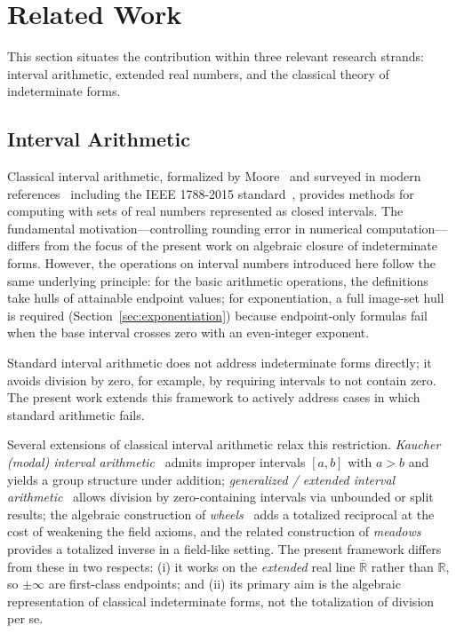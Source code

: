 \documentclass[11pt,a4paper]{article}
\theoremstyle{paperdef}
\newcommand{\Rext}{\overline{\mathbb{R}}}
\begin{document}
\section{Related Work}\label{sec:related-work}

This section situates the contribution within three relevant research
strands: interval arithmetic, extended real numbers, and the classical
theory of indeterminate forms.

\subsection{Interval Arithmetic}

Classical interval arithmetic, formalized by Moore~\cite{Moore1966}
and surveyed in modern references~\cite{Moore2009,Neumaier1990}
including the IEEE 1788-2015 standard~\cite{IEEE1788}, provides
methods for computing with sets of real numbers represented as closed
intervals. The fundamental motivation---controlling rounding error in
numerical computation---differs from the focus of the present work on
algebraic closure of indeterminate forms. However, the operations on
interval numbers introduced here follow the same underlying principle:
for the basic arithmetic operations, the definitions take hulls of
attainable endpoint values; for exponentiation, a full image-set hull
is required (Section~\ref{sec:exponentiation}) because endpoint-only
formulas fail when the base interval crosses zero with an even-integer
exponent.

Standard interval arithmetic does not address indeterminate forms
directly; it avoids division by zero, for example, by requiring
intervals to not contain zero. The present work extends this framework
to actively address cases in which standard arithmetic fails.

Several extensions of classical interval arithmetic relax this
restriction. \emph{Kaucher (modal) interval
arithmetic}~\cite{Kaucher1980} admits improper intervals $[a, b]$ with
$a > b$ and yields a group structure under addition; \emph{generalized
/ extended interval arithmetic}~\cite{HansenWalster2004} allows
division by zero-containing intervals via unbounded or split results;
the algebraic construction of \emph{wheels}~\cite{Carlstroem2004} adds
a totalized reciprocal at the cost of weakening the field axioms, and
the related construction of \emph{meadows}~\cite{BergstraTucker2007}
provides a totalized inverse in a field-like setting. The present
framework differs from these in two respects: (i) it works on the
\emph{extended} real line $\Rext$ rather than $\mathbb{R}$, so
$\pm\infty$ are first-class endpoints; and (ii) its primary aim is the
algebraic representation of classical indeterminate forms, not the
totalization of division per se.
\end{document}
